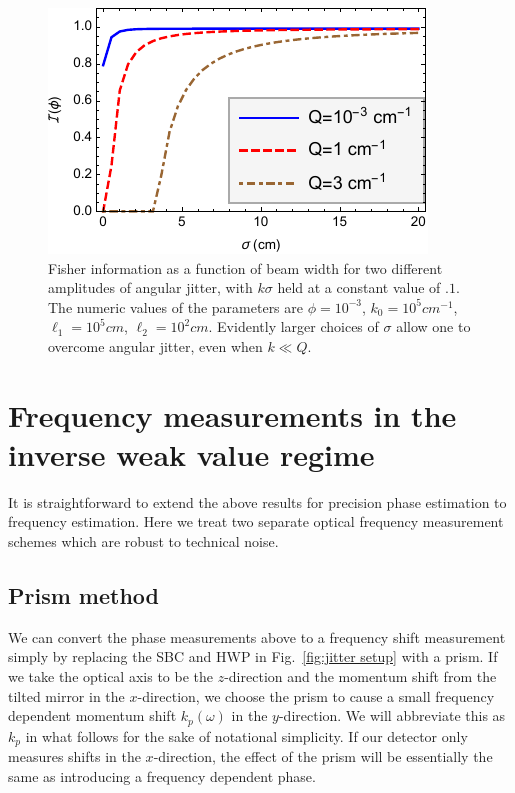 \begin{figure}
	\includegraphics[scale=1]{InverseWeakValueNoise/Figures/AngularJitter.pdf}
	\caption{Fisher information as a function of beam width for two different amplitudes of angular jitter, with $k\sigma$ held at a constant value of $.1$.  The numeric values of the parameters are $\phi=10^{-3}$, $k_0 = 10^5 cm^{-1}$, $\ell_1 = 10^5 cm$, $\ell_2 = 10^2 cm$.  Evidently larger choices of $\sigma$ allow one to overcome angular jitter, even when $k \ll Q$.}\label{fig:jitter plot}
\end{figure}

\section{Frequency measurements in the inverse weak value regime}\label{sec:frequency}
It is straightforward to extend the above results for precision phase estimation to frequency estimation.  Here we treat two separate optical frequency measurement schemes which are robust to technical noise.

\subsection{Prism method}
We can convert the phase measurements above to a frequency shift measurement simply by replacing the SBC and HWP in Fig.~\ref{fig:jitter setup} with a prism.  If we take the optical axis to be the $z$-direction and the momentum shift from the tilted mirror in the $x$-direction, we choose the prism to cause a small frequency dependent momentum shift $k_p(\omega)$ in the $y$-direction.  We will abbreviate this as $k_p$ in what follows for the sake of notational simplicity.  If our detector only measures shifts in the $x$-direction, the effect of the prism will be essentially the same as introducing a frequency dependent phase.  

